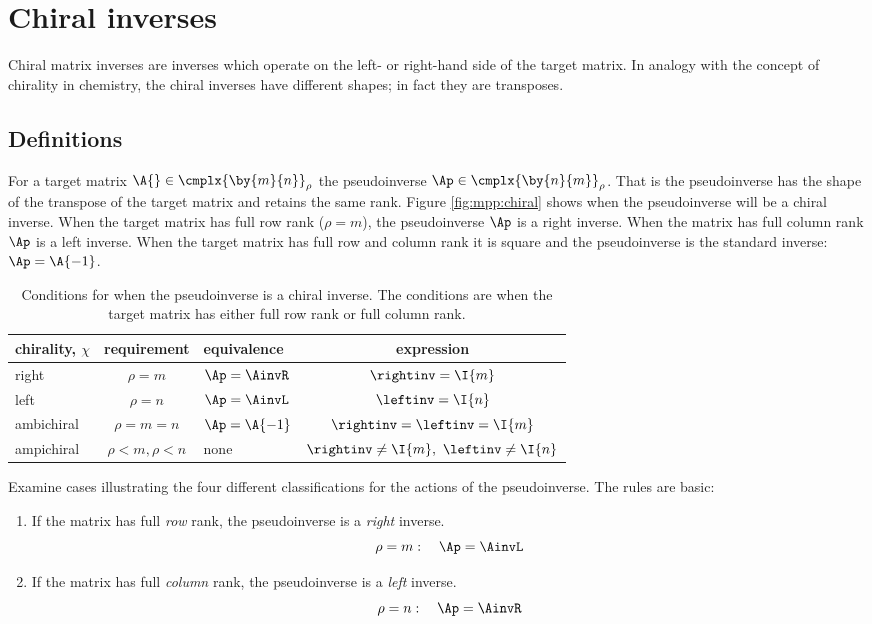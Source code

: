 \section{Chiral inverses}
\label{sec:chiral}
Chiral matrix inverses are inverses which operate on the left- or right-hand side of the target matrix. In analogy with the concept of chirality in chemistry, the chiral inverses have different shapes; in fact they are transposes.

\subsection{Definitions}
For a target matrix $\A{}\in\cmplx{\by{m}{n}}_{\rho}$ the pseudoinverse $\Ap\in\cmplx{\by{n}{m}}_{\rho}$. That is the pseudoinverse has the shape of the transpose of the target matrix and retains the same rank. Figure \eqref{fig:mpp:chiral} shows when the pseudoinverse will be a chiral inverse. When the target matrix has full row rank ($\rho=m$), the pseudoinverse $\Ap$ is a right inverse. When the matrix has full column rank $\Ap$ is a left inverse. When the target matrix has full row and column rank it is square and the pseudoinverse is the standard inverse: $\Ap=\A{-1}$.

\begin{table}[htdp]
\begin{center}
\begin{tabular}{l|clc}
chirality, $\chi$ & requirement & equivalence & expression\\\hline
right & $\rho = m$ & $\Ap=\AinvR$ & $\rightinv=\I{m}$\\
left  & $\rho = n$ & $\Ap=\AinvL$ & $\leftinv=\I{n}$\\
ambichiral & $\rho=m=n$ & $\Ap=\A{-1}$ & $\rightinv=\leftinv=\I{m}$\\
ampichiral & $\rho< m,\rho< n$ & \quad none & $\rightinv\ne\I{m},\ \leftinv\ne\I{n}$\\
\end{tabular}
\end{center}
\label{fig:mpp:chiral}
\caption[Conditions for when the pseudoinverse is a chiral inverse]{Conditions for when the pseudoinverse is a chiral inverse. The conditions are when the target matrix has either full row rank or full column rank.}
\end{table}%

Examine cases illustrating the four different classifications for the actions of the pseudoinverse. The rules are basic:
\begin{enumerate}
\item If the matrix has full \textit{row} rank, the pseudoinverse is a \textit{right} inverse.
\begin{equation}
  \rho = m: \quad \Ap = \AinvL
\end{equation}
\item If the matrix has full \textit{column} rank, the pseudoinverse is a \textit{left} inverse.
\begin{equation}
  \rho = n: \quad \Ap = \AinvR
\end{equation}
\end{enumerate}

